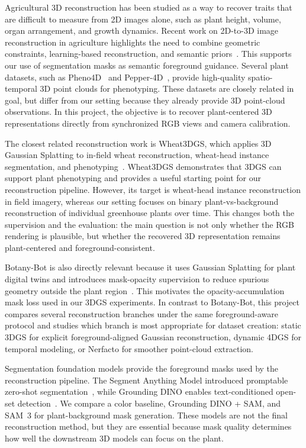 \documentclass[sigconf]{acmart}
\begin{document}
Agricultural 3D reconstruction has been studied as a way to recover traits that are difficult to measure from 2D images alone, such as plant height, volume, organ arrangement, and growth dynamics. Recent work on 2D-to-3D image reconstruction in agriculture highlights the need to combine geometric constraints, learning-based reconstruction, and semantic priors~\cite{sankaramaddi2026agriculture3d}. This supports our use of segmentation masks as semantic foreground guidance. Several plant datasets, such as Pheno4D~\cite{schunck2021pheno4d} and Pepper-4D~\cite{ahmed2026pepper4d}, provide high-quality spatio-temporal 3D point clouds for phenotyping. These datasets are closely related in goal, but differ from our setting because they already provide 3D point-cloud observations. In this project, the objective is to recover plant-centered 3D representations directly from synchronized RGB views and camera calibration.

The closest related reconstruction work is Wheat3DGS, which applies 3D Gaussian Splatting to in-field wheat reconstruction, wheat-head instance segmentation, and phenotyping~\cite{wheat3dgs}. Wheat3DGS demonstrates that 3DGS can support plant phenotyping and provides a useful starting point for our reconstruction pipeline. However, its target is wheat-head instance reconstruction in field imagery, whereas our setting focuses on binary plant-vs-background reconstruction of individual greenhouse plants over time. This changes both the supervision and the evaluation: the main question is not only whether the RGB rendering is plausible, but whether the recovered 3D representation remains plant-centered and foreground-consistent.

Botany-Bot is also directly relevant because it uses Gaussian Splatting for plant digital twins and introduces mask-opacity supervision to reduce spurious geometry outside the plant region~\cite{adebola2025botanybot}. This motivates the opacity-accumulation mask loss used in our 3DGS experiments. In contrast to Botany-Bot, this project compares several reconstruction branches under the same foreground-aware protocol and studies which branch is most appropriate for dataset creation: static 3DGS for explicit foreground-aligned Gaussian reconstruction, dynamic 4DGS for temporal modeling, or Nerfacto for smoother point-cloud extraction.

Segmentation foundation models provide the foreground masks used by the reconstruction pipeline. The Segment Anything Model introduced promptable zero-shot segmentation~\cite{kirillov2023segment}, while Grounding DINO enables text-conditioned open-set detection~\cite{liu2023groundingdino}. We compare a color baseline, Grounding DINO + SAM, and SAM~3 for plant-background mask generation. These models are not the final reconstruction method, but they are essential because mask quality determines how well the downstream 3D models can focus on the plant.
\end{document}
